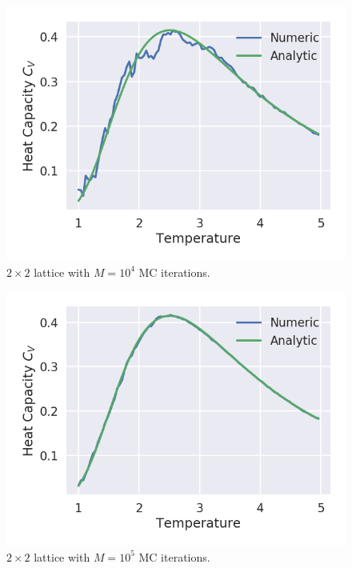 \documentclass[aps,reprint]{revtex4-1}
\begin{document}
\begin{figure}[H]
  \centering
  \includegraphics[width=\columnwidth]{figures/L2Ne4.png}
  \caption{$2 \times 2$ lattice with $M = 10^4$ MC iterations.}
  \label{fig:L2Ne4}
\end{figure}
\begin{figure}[H]
  \centering
  \includegraphics[width=\columnwidth]{figures/L2Ne5.png}
  \caption{$2 \times 2$ lattice with $M = 10^5$ MC iterations.}
  \label{fig:L2Ne5}
\end{figure}
\end{document}
